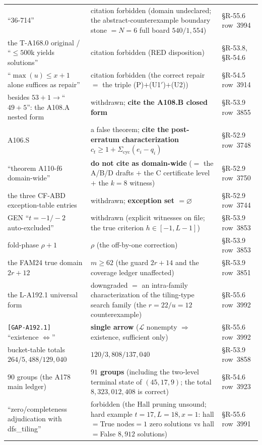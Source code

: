 \begin{longtable}{p{}p{}p{}}
``36-714'' & citation forbidden (domain undeclared; the abstract-counterexample boundary stone $=N=6$ full board $540/1{,}554$) & \S R-55.6 row~3994 \\
the T-A168.0 original / ``$\le500$k yields solutions'' & citation forbidden (RED disposition) & \S R-53.8, \S R-54.6 \\
``$\max(u)\le x+1$ alone suffices as repair'' & citation forbidden (the correct repair $=$ the triple (P)$+$(U1$'$)$+$(U2)) & \S R-54.5 row~3914 \\
besides $53+1\to$``$49+5$'': the A108.A nested form & withdrawn; \textbf{cite the A108.B closed form} & \S R-53.9 row~3855 \\
A106.S & a false theorem; \textbf{cite the post-erratum characterization} $c_t\ge1+\Sigma_\mathrm{cyc}(e_i-q_i)$ & \S R-52.9 row~3748 \\
``theorem A110-f6 domain-wide'' & \textbf{do not cite as domain-wide} ($=$ the A/B/D drafts $+$ the C certificate level $+$ the $k=8$ witness) & \S R-52.9 row~3750 \\
the three CF-ABD exception-table entries & withdrawn; \textbf{exception set $=\varnothing$} & \S R-52.9 row~3744 \\
GEN ``$t=-1/-2$ auto-excluded'' & withdrawn (explicit witnesses on file; the true criterion $h\in[-1,L-1]$) & \S R-53.9 row~3853 \\
fold-phase $\rho+1$ & \textbf{$\rho$} (the off-by-one correction) & \S R-53.9 row~3853 \\
the FAM24 true domain $2r+12$ & \textbf{$m\ge62$} (the guard $2r+14$ and the coverage ledger unaffected) & \S R-53.9 row~3851 \\
the L-A192.1 universal form & downgraded $=$ an intra-family characterization of the tiling-type search family (the $r=22/u=12$ counterexample) & \S R-55.6 row~3992 \\
\texttt{[GAP-A192.1]} ``existence $\iff$'' & \textbf{single arrow} ($\mathcal{L}$ nonempty $\Rightarrow$ existence, sufficient only) & \S R-55.6 row~3992 \\
bucket-table totals $264/5{,}488/129{,}040$ & \textbf{$120/3{,}808/137{,}040$} & \S R-53.9 row~3858 \\
$90$ groups (the A178 main ledger) & \textbf{$91$ groups} (including the two-level terminal state of $(45,17,9)$; the total $8{,}323{,}012{,}408$ is correct) & \S R-54.6 row~3923 \\
``zero/completeness adjudication with dfs\_tiling'' & forbidden (the Hall pruning unsound; hard example $t=17,L=18,x=1$: hall$=$True nodes$=1$ zero solutions vs hall$=$False $8{,}912$ solutions) & \S R-55.6 row~3991 \\

\end{longtable}
